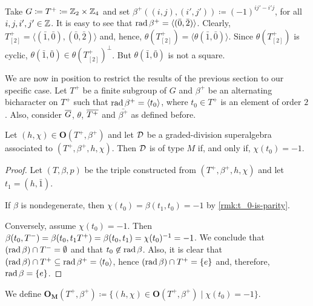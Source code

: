 \begin{example}\label{ex:T+-but-no-T}
    Take $G \coloneqq T^+ \coloneqq \mathbb{Z}_2 \times \mathbb{Z}_4$ and set $\beta^+((i, j),(i', j')) \coloneqq (-1)^{ij' - i'j}$, for all $i,j, i',j' \in \mathbb{Z}$. 
    It is easy to see that $\operatorname{rad} \beta^+ = \langle (\bar 0, \bar 2) \rangle$. 
    Clearly,
    $T^+_{[2]} = \langle (\bar 1, \bar 0) , (\bar 0, \bar 2) \rangle$ and, hence, $\theta(T^+_{[2]}) = \langle \theta(\bar 1, \bar 0) \rangle$. 
    Since $\theta(T^+_{[2]})$ is cyclic, $\theta(\bar 1, \bar 0) \in \theta(T^+_{[2]})^\perp$. 
    But $\theta(\bar 1, \bar 0)$ is not a square. 
\end{example}


We are now in position to restrict the results of the previous section to our specific case. 
Let $T^+$ be a finite subgroup of $G$ and $\beta^+$ be an alternating bicharacter on $T^+$ such that $\operatorname{rad} \beta^+ = \langle t_0 \rangle$, where $t_0\in T^+$ is an element of order $2$. 
Also, consider $\barr G$, $\theta$, $\barr {T^+}$ and $\bar{\beta^+}$ as defined before. 

\begin{lemma}\label{lemma:motivation-O_M}
    Let $(h, \chi) \in \mathbf{O}(T^+, \beta^+)$ and let $\mathcal{D}$ be a graded-division superalgebra associated to $(T^+, \beta^+, h, \chi)$. 
    Then $\mathcal{D}$ is of type $M$ if, and only if, $\chi(t_0) = -1$.
\end{lemma}

\begin{proof}
    Let $(T, \beta, p)$ be the triple constructed from $(T^+, \beta^+, h, \chi)$ and let $t_1 = (h, \bar 1)$. 
    
    If $\beta$ is nondegenerate, then $\chi(t_0) = \beta(t_1, t_0) = -1$ by \cref{rmk:t_0-is-parity}. 
    
    Conversely, assume $\chi(t_0) = -1$. 
    Then $\beta(t_0, T^-) = \beta(t_0, t_1T^+) = \beta (t_0, t_1) = \chi(t_0)^{-1} = -1$. 
    We conclude that $(\operatorname{rad} \beta)\cap T^- = \emptyset$ and that $t_0 \not\in \operatorname{rad}\beta$. 
    Also, it is clear that $(\operatorname{rad} \beta)\cap T^+ \subseteq \operatorname{rad} \beta^+ = \langle t_0 \rangle$, hence $(\operatorname{rad} \beta)\cap T^+ = \{e\}$ and, therefore, $\operatorname{rad} \beta = \{e\}$.
\end{proof}

\begin{defi}\label{def:O_M}
    We define $\mathbf{O_M}(T^+, \beta^+) \coloneqq \{ (h, \chi) \in \mathbf{O}(T^+, \beta^+) \mid \chi(t_0) = -1 \}$.
\end{defi}

